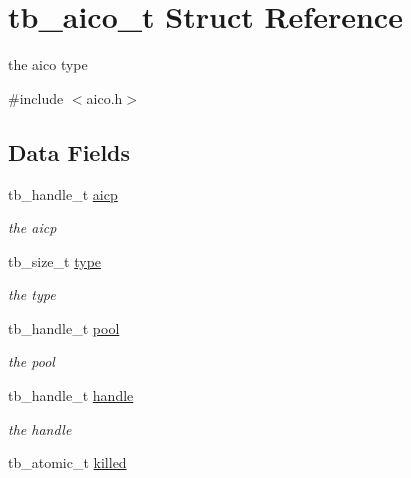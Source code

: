 \hypertarget{structtb__aico__t}{\section{tb\-\_\-aico\-\_\-t Struct Reference}
\label{structtb__aico__t}
}


the aico type  




{\ttfamily \#include $<$aico.\-h$>$}

\subsection*{Data Fields}
\begin{DoxyCompactItemize}
\item 
\hypertarget{structtb__aico__t_a967cf9a18fc8a5c876c750d46c0009b8}{tb\-\_\-handle\-\_\-t \hyperlink{structtb__aico__t_a967cf9a18fc8a5c876c750d46c0009b8}{aicp}}\label{structtb__aico__t_a967cf9a18fc8a5c876c750d46c0009b8}

\begin{DoxyCompactList}\small\item\em the aicp \end{DoxyCompactList}\item 
\hypertarget{structtb__aico__t_a5fe3186e8b4a84c50695e0ad8894b4b9}{tb\-\_\-size\-\_\-t \hyperlink{structtb__aico__t_a5fe3186e8b4a84c50695e0ad8894b4b9}{type}}\label{structtb__aico__t_a5fe3186e8b4a84c50695e0ad8894b4b9}

\begin{DoxyCompactList}\small\item\em the type \end{DoxyCompactList}\item 
\hypertarget{structtb__aico__t_adf24b55417e498fc6c22a0d3dd2299f3}{tb\-\_\-handle\-\_\-t \hyperlink{structtb__aico__t_adf24b55417e498fc6c22a0d3dd2299f3}{pool}}\label{structtb__aico__t_adf24b55417e498fc6c22a0d3dd2299f3}

\begin{DoxyCompactList}\small\item\em the pool \end{DoxyCompactList}\item 
\hypertarget{structtb__aico__t_a155d035116288bc0cd0555ddeb18148c}{tb\-\_\-handle\-\_\-t \hyperlink{structtb__aico__t_a155d035116288bc0cd0555ddeb18148c}{handle}}\label{structtb__aico__t_a155d035116288bc0cd0555ddeb18148c}

\begin{DoxyCompactList}\small\item\em the handle \end{DoxyCompactList}\item 
\hypertarget{structtb__aico__t_af035009e89f5599376f1c17af6453c6e}{tb\-\_\-atomic\-\_\-t \hyperlink{structtb__aico__t_af035009e89f5599376f1c17af6453c6e}{killed}}\label{structtb__aico__t_af035009e89f5599376f1c17af6453c6e}


\end{DoxyCompactItemize}
